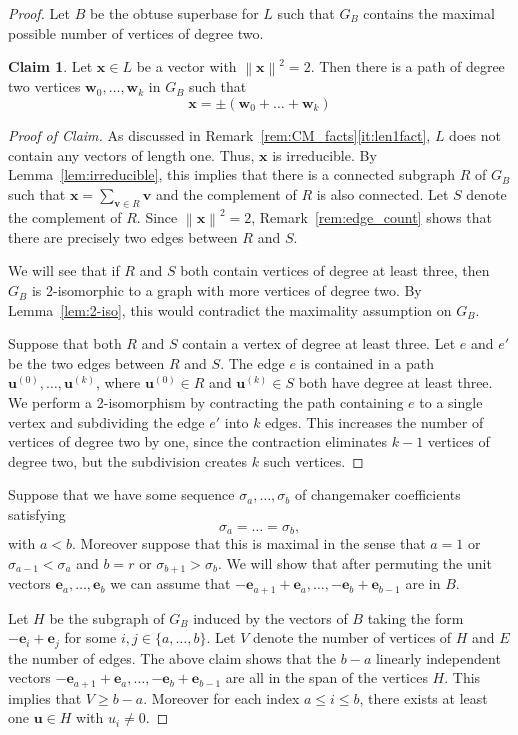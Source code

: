 \documentclass{amsart} %
\newcommand{\e}{\bm{e}}
\newcommand{\bv}{\bm{v}}
\newcommand{\norm}[1]{\left\lVert #1 \right\rVert^2}
\theoremstyle{thm}
\theoremstyle{definition}
\newtheorem*{claim}{Claim}
\numberwithin{equation}{section}
\begin{document}
\begin{proof}
Let $B$ be the obtuse superbase for $L$ such that $G_B$ contains the maximal possible number of vertices of degree two.
\begin{claim}
    Let $\bm{x}\in L$ be a vector with $\norm{\bm{x}}=2$. Then there is a path of degree two vertices $\bm{w}_0, \dots, \bm{w}_k$ in $G_B$ such that
    \[
    \bm{x}=\pm(\bm{w}_0+ \dots+ \bm{w}_k)
    \]
\end{claim}
\begin{proof}[Proof of Claim]
As discussed in Remark~\ref{rem:CM_facts}\eqref{it:len1fact}, $L$ does not contain any vectors of length one. Thus, $\bm{x}$ is irreducible. By Lemma~\ref{lem:irreducible}, this implies that there is a connected subgraph $R$ of $G_B$ such that $\bm{x}=\sum_{\bv\in R} \bm{v}$ and the complement of $R$ is also connected. Let $S$ denote the complement of $R$. Since $\norm{\bm{x}}=2$, Remark~\ref{rem:edge_count} shows that there are precisely two edges between $R$ and $S$.

We will see that if $R$ and $S$ both contain vertices of degree at least three, then $G_B$ is 2-isomorphic to a graph with more vertices of degree two. By Lemma~\ref{lem:2-iso}, this would contradict the maximality assumption on $G_B$.

Suppose that both $R$ and $S$ contain a vertex of degree at least three. Let $e$ and $e'$ be the two edges between $R$ and $S$. The edge $e$ is contained in a path $\bm{u}^{(0)}, \dots, \bm{u}^{(k)}$, where $\bm{u}^{(0)}\in R$ and $\bm{u}^{(k)}\in S$ both have degree at least three. We perform a 2-isomorphism by contracting the path containing $e$ to a single vertex and subdividing the edge $e'$ into $k$ edges. This increases the number of vertices of degree two by one, since the contraction eliminates $k-1$ vertices of degree two, but the subdivision creates $k$ such vertices.
\end{proof}
Suppose that we have some sequence $\sigma_a, \dots, \sigma_b$ of changemaker coefficients satisfying 
\[
\sigma_a= \dots = \sigma_b,
\]
with $a<b$. Moreover suppose that this is maximal in the sense that $a=1$ or $\sigma_{a-1}<\sigma_a$ and $b=r$ or $\sigma_{b+1}>\sigma_b$. We will show that after permuting the unit vectors $\e_a, \dots, \e_b$ we can assume that $-\e_{a+1}+\e_a, \dots, -\e_{b}+\e_{b-1}$ are in $B$.

Let $H$ be the subgraph of $G_B$ induced by the vectors of $B$ taking the form $-\e_i + \e_j$ for some $i,j\in \{a,\dots, b\}$. Let $V$ denote the number of vertices of $H$ and $E$ the number of edges. The above claim shows that the $b-a$ linearly independent vectors $-\e_{a+1}+\e_{a}, \dots, -\e_{b}+\e_{b-1}$ are all in the span of the vertices $H$. This implies that $V\geq b-a$. Moreover for each index $a\leq i \leq b$, there exists at least one $\bm{u}\in H$ with $u_i\neq 0$.


\end{proof}
\end{document}
